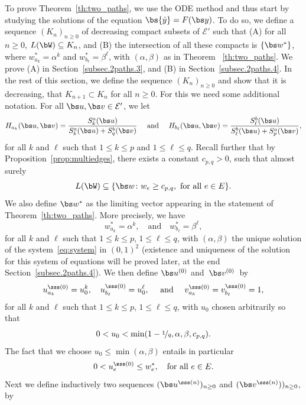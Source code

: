 To prove Theorem~\ref{th:two_paths}, we use the ODE method and thus start by studying the solutions of the equation ${\bs{\dot y}} =F({\bs y})$. To do so, we define a sequence $(K_n)_{n\geq 0}$ of decreasing compact subsets of $\mathcal E'$ such that (A) for all $n\geq 0$, $L(\bW)\subseteq K_n$, and (B) the intersection of all these compacts is $\{\bs w^*\}$, where $w_{a_k}^* = \alpha^k$ and $w_{b_\ell}^* = \beta^\ell$, with $(\alpha, \beta)$ as in Theorem ~\ref{th:two_paths}.
We prove (A) in Section~\eqref{subsec.2paths.3}, and (B) in Section~\ref{subsec.2paths.4}.
In the rest of this section, we define the sequence $(K_n)_{n\geq 0}$ and show that it is decreasing,
\ie that $K_{n+1} \subset K_n$ for all $n\ge 0$.
For this we need some additional notation.
For all $\bs u,\bs v \in \mathcal E'$, we let
\[
H_{a_k}(\bs u,\bs v)
= \frac{S^a_k(\bs u)}{S^a_k(\bs u)+S^b_q(\bs v)}
\quad\text{ and }\quad
H_{b_\ell}(\bs u,\bs v)
= \frac{S^b_\ell(\bs u)}{S^b_\ell(\bs u)+S^a_p(\bs v)},
\]
for all $k$ and $\ell$ such that $1\leq k\leq p$ and $1\leq \ell\leq q$.
Recall further that by Proposition~\ref{prop:multiedges}, there exists a constant $c_{p,q}>0$, such that almost surely
\begin{equation}\label{K0def}
L(\bW) \subseteq \{\bs w\colon w_e\ge c_{p,q}, \text{ for all }e\in E\}.
\end{equation}
{We also define $\bs w^*$ as the limiting vector appearing in the statement of Theorem~\ref{th:two_paths}. More precisely, we have }
\begin{equation}\label{w*}
{w_{a_k}^* = \alpha^k, \quad \text{and} \quad w_{b_\ell}^* = \beta^\ell,}
\end{equation}
{for all $k$ and $\ell$ such that  $1\le k\le p$, $1\le \ell \le q$, with $(\alpha,\beta)$ the unique solution of the system~\eqref{eq:system} in $(0,1)^2$ (existence and {uniqueness} of the solution for this system of equations will be proved later, at the end Section~\ref{subsec.2paths.4}).}
We then define $\bs u^{(0)}$ and~$\bs v^{(0)}$~by
\[
u^{\sss (0)}_{a_k}=u_0^k, \quad
u^{\sss (0)}_{b_\ell}=u_0^\ell,\quad \text{ and }\quad
v^{\sss (0)}_{a_k}=v^{\sss (0)}_{b_\ell}=1,
\]
for all $k$ and $\ell$ such that  $1\le k\le p$, $1\le \ell \le q$, with $u_0$ chosen arbitrarily so that
\[
0< u_0<\min(1-\nicefrac1q,\alpha,\beta,c_{p,q}).
\]
The fact that we choose $u_0\le \min(\alpha,\beta)$ entails in particular
\[
0< u^{\sss (0)}_e\leq w^*_e, \quad \text{for all }e\in E.
\]
Next we define inductively two sequences $(\bs u^{\sss (n)})_{n\ge 0}$ and $(\bs v^{\sss (n)}))_{n\ge 0}$, by
